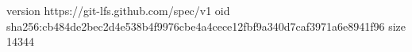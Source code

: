 version https://git-lfs.github.com/spec/v1
oid sha256:cb484de2bec2d4e538b4f9976cbe4a4cece12fbf9a340d7caf3971a6e8941f96
size 14344
